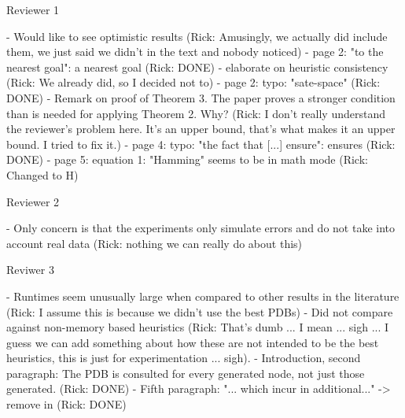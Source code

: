 Reviewer 1

- Would like to see optimistic results (Rick: Amusingly, we actually did include them, we just said we didn't in the text and nobody noticed)
- page 2: "to the nearest goal": a nearest goal (Rick: DONE)
- elaborate on heuristic consistency (Rick: We already did, so I decided not to)
- page 2: typo: "sate-space" (Rick: DONE)
- Remark on proof of Theorem 3. The paper proves a stronger condition than is needed for applying Theorem 2. Why? (Rick: I don't really understand the reviewer's problem here. It's an upper bound, that's what makes it an upper bound. I tried to fix it.)
- page 4: typo: "the fact that [...] ensure": ensures (Rick: DONE)
- page 5: equation 1: "Hamming" seems to be in math mode (Rick: Changed to H)



Reviewer 2

- Only concern is that the experiments only simulate errors and do not take into account real data (Rick: nothing we can really do about this)


Reviwer 3

- Runtimes seem unusually large when compared to other results in the literature (Rick: I assume this is because we didn't use the best PDBs)
- Did not compare against non-memory based heuristics (Rick: That's dumb ... I mean ... sigh ... I guess we can add something about how these are not intended to be the best heuristics, this is just for experimentation ... sigh).
- Introduction, second paragraph: The PDB is consulted for every generated node, not just those generated. (Rick: DONE)
- Fifth paragraph: "... which incur in additional..." -> remove in (Rick: DONE)

